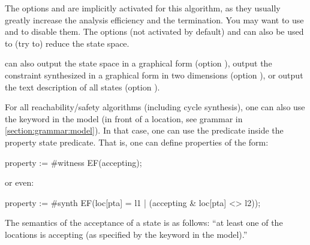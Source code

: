 The options  \cite{AFS13atva} and  are implicitly activated for this algorithm, as they usually greatly increase the analysis efficiency and the termination.
You may want to use  and  to disable them.
The options  (not activated by default) and  can also be used to (try to) reduce the state space.

\imitator{} can also
output the state space in a graphical form (option ),
output the constraint synthesized in a graphical form in two dimensions (option ),
or
output the text description of all states (option ).


\begin{remark}\label{remark:accepting}
	For all reachability/safety algorithms (including cycle synthesis), one can also use the  keyword in the model (in front of a location, see grammar in \cref{section:grammar:model}).
	In that case, one can use the  predicate inside the property state predicate.
	That is, one can define properties of the form:

\begin{IMITATORproperty}
property := #witness EF(accepting);
\end{IMITATORproperty}

	or even:

\begin{IMITATORproperty}
property := #synth EF(loc[pta] = l1 | (accepting & loc[pta] <> l2));
\end{IMITATORproperty}

	The semantics of the acceptance of a state is as follows: ``at least one of the locations is accepting (as specified by the  keyword in the model).''

%
\end{remark}

